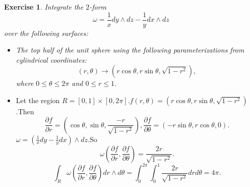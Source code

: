 \documentclass[a4paper]{article}
\newtheorem*{exe}{Exercise}
\newenvironment{exercise}
{\bigskip\begin{mdframed}\begin{exe}}
    {\end{exe}\end{mdframed}\bigskip}
\newcommand{\pa}{\partial} \newcommand{\Om}{\Omega}
\begin{document}
\begin{exercise}
Integrate the $2$-form 
$$
\omega=\frac{1}{x}dy\wedge dz-\frac{1}{y}dx\wedge dz
$$
over the following surfaces:
\begin{itemize}
\item The top half of the unit sphere using the following
  parameterizations from cylindrical  coordinates:
$$
(r,\theta)\to (r\cos\theta,r\sin\theta,\sqrt{1-r^2}),
$$
where $0\leq\theta\leq 2\pi$ and $0\leq r\leq 1$.
\end{itemize}
\end{exercise}
\begin{itemize}
\item Let the region $R=[0,1]\times [0,2\pi]$.$f(r,\theta)=(r\cos\theta,r\sin\theta,\sqrt{1-r^2})$.Then 
$$
\frac{\pa f}{\pa r}=\left(\cos\theta,\sin\theta,\frac{-r}{
  \sqrt{1-r^{2}}}\right),\frac{\pa f}{\pa\theta}=\left(-r\sin\theta,r\cos\theta,0\right).
$$
$\omega=(\frac{1}{x}dy-\frac{1}{y}dx)\wedge dz$.So
$$
\omega\left(\frac{\pa f}{\pa r},\frac{\pa f}{\pa\theta}\right)=\frac{2r}{\sqrt{1-r^2}}.
$$
$$
\int_{R} \omega\left(\frac{\pa f}{\pa r},\frac{\pa
    f}{\pa\theta}\right) dr\wedge d\theta=\int_0^{2\pi}\int_0^1 \frac{2r}{\sqrt{1-r^2}}drd\theta=4\pi.
$$
\end{itemize}
\end{document}
